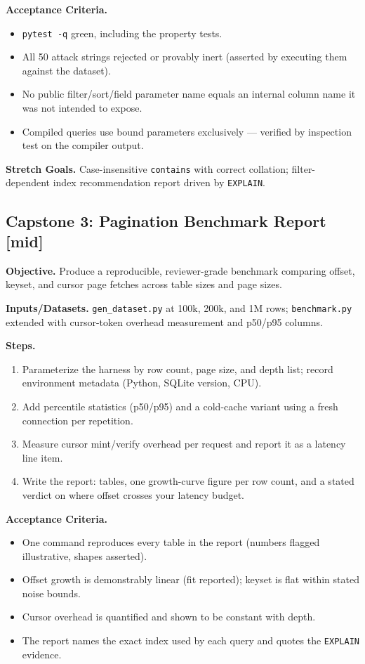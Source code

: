 \textbf{Acceptance Criteria.}
\begin{itemize}
  \item[$\square$] \texttt{pytest -q} green, including the property tests.
  \item[$\square$] All 50 attack strings rejected or provably inert
        (asserted by executing them against the dataset).
  \item[$\square$] No public filter/sort/field parameter name equals an
        internal column name it was not intended to expose.
  \item[$\square$] Compiled queries use bound parameters exclusively ---
        verified by inspection test on the compiler output.
\end{itemize}

\textbf{Stretch Goals.} Case-insensitive \texttt{contains} with correct
collation; filter-dependent index recommendation report driven by
\texttt{EXPLAIN}.

\subsection{Capstone 3: Pagination Benchmark Report [mid]}

\textbf{Objective.} Produce a reproducible, reviewer-grade benchmark
comparing offset, keyset, and cursor page fetches across table sizes and
page sizes.

\textbf{Inputs/Datasets.} \texttt{gen\_dataset.py} at 100k, 200k, and 1M
rows; \texttt{benchmark.py} extended with cursor-token overhead
measurement and p50/p95 columns.

\textbf{Steps.}
\begin{enumerate}
  \item Parameterize the harness by row count, page size, and depth list;
        record environment metadata (Python, SQLite version, CPU).
  \item Add percentile statistics (p50/p95) and a cold-cache variant using
        a fresh connection per repetition.
  \item Measure cursor mint/verify overhead per request and report it as a
        latency line item.
  \item Write the report: tables, one growth-curve figure per row count,
        and a stated verdict on where offset crosses your latency budget.
\end{enumerate}

\textbf{Acceptance Criteria.}
\begin{itemize}
  \item[$\square$] One command reproduces every table in the report
        (numbers flagged illustrative, shapes asserted).
  \item[$\square$] Offset growth is demonstrably linear (fit reported);
        keyset is flat within stated noise bounds.
  \item[$\square$] Cursor overhead is quantified and shown to be constant
        with depth.
  \item[$\square$] The report names the exact index used by each query and
        quotes the \texttt{EXPLAIN} evidence.
\end{itemize}

